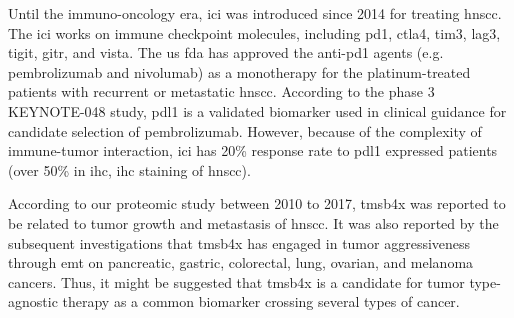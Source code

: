 \documentclass[jpm,article,submit,moreauthors,pdftex]{Definitions/mdpi}
\begin{document}
Until the immuno-oncology era, \acrfull{ici} was introduced since 2014 for treating \acrshort{hnscc}\cite{Seiwert2014}\cite{Swanson2015}.
The \acrshort{ici} works on immune checkpoint molecules, including \acrfull{pd1}, \acrfull{ctla4}, \acrfull{tim3}, \acrfull{lag3}, \acrfull{tigit}, \acrfull{gitr}, and \acrfull{vista}\cite{Mei2020}.
The \acrshort{us} \acrshort{fda} has approved the anti-\acrshort{pd1} agents (e.g. pembrolizumab and nivolumab) as a monotherapy for the platinum-treated patients with recurrent or metastatic \acrshort{hnscc}\cite{Cramer2019}. 
According to the phase 3 KEYNOTE-048 study, \acrshort{pdl1} is a validated biomarker used in clinical guidance for candidate selection of pembrolizumab\cite{Burtness2019}\cite{Gavrielatou2020}.
However, because of the complexity of immune-tumor interaction, \acrshort{ici} has 20\% response rate to \acrfull{pdl1} expressed patients (over 50\% in \acrlong{ihc}, \acrshort{ihc} staining of \acrshort{hnscc})\cite{Swanson2015}\cite{Gavrielatou2020}.

According to our proteomic study between 2010 to 2017, \acrfull{tmsb4x} was reported to be related to tumor growth and metastasis of \acrshort{hnscc}\cite{Chi2017}. It was also reported by the subsequent investigations that \acrshort{tmsb4x} has engaged in tumor aggressiveness through \acrfull{emt} on pancreatic\cite{Zhang2008}, gastric\cite{Ryu2012}, colorectal\cite{Gemoll2015}, lung\cite{Huang2016}, ovarian\cite{Chu2019}, and melanoma\cite{Makowiecka2019} cancers. Thus, it might be suggested that \acrshort{tmsb4x}  is a candidate for tumor type-agnostic therapy\cite{Yan2018} as a common biomarker crossing several types of cancer.
\end{document}

